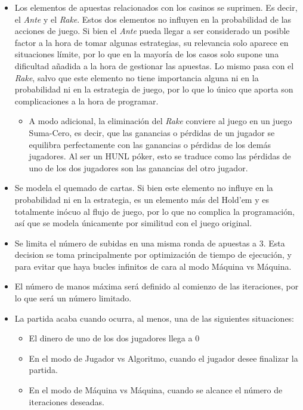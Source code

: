 \begin{itemize}
\item Los elementos de apuestas relacionados con los casinos se suprimen. Es decir, el \textit{Ante} y el \textit{Rake}. Estos dos elementos no influyen en la probabilidad de las acciones de juego. Si bien el \textit{Ante}  pueda llegar a ser considerado un posible factor a la hora de tomar algunas estrategias, su relevancia solo aparece en situaciones límite, por lo que en la mayoría de los casos solo supone una dificultad añadida a la hora de gestionar las apuestas. Lo mismo pasa con el \textit{Rake}, salvo que este elemento no tiene importancia alguna ni en la probabilidad ni en la estrategia de juego, por lo que lo único que aporta son complicaciones a la hora de programar.
 \begin{itemize}
\item A modo adicional, la eliminación del \textit{Rake} conviere al juego en un juego Suma-Cero, es decir, que las ganancias o pérdidas de un jugador se equilibra perfectamente con las ganancias o pérdidas de los demás jugadores. Al ser un HUNL póker, esto se traduce como las pérdidas de uno de los dos jugadores son las ganancias del otro jugador.
\end{itemize}
\item Se modela el quemado de cartas. Si bien este elemento no influye en la probabilidad ni en la estrategia, es un elemento más del Hold'em y es totalmente inócuo al flujo de juego, por lo que no complica la programación, así que se modela únicamente por similitud con el juego original.
\item Se limita el número de subidas en una misma ronda de apuestas a 3. Esta decision se toma principalmente por optimización de tiempo de ejecución, y para evitar que haya bucles infinitos de cara al modo Máquina vs Máquina.
\item El número de manos máxima será definido al comienzo de las iteraciones, por lo que será un número limitado.
\item La partida acaba cuando ocurra, al menos, una de las siguientes situaciones:
\begin{itemize}
\item El dinero de uno de los dos jugadores llega a 0
\item En el modo de Jugador vs Algoritmo, cuando el jugador desee finalizar la partida.
\item En el modo de Máquina vs Máquina, cuando se alcance el número de iteraciones deseadas.
\end{itemize}
\end{itemize}

